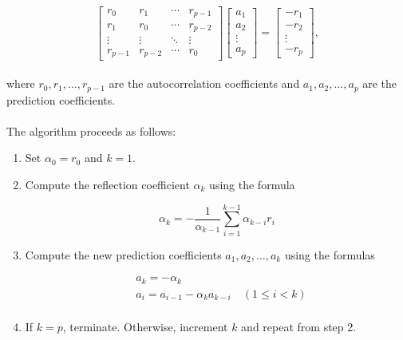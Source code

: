     \begin{equation*}
        \begin{bmatrix}
        r_0 & r_1 & \cdots & r_{p-1} \\
        r_1 & r_0 & \cdots & r_{p-2} \\
        \vdots & \vdots & \ddots & \vdots \\
        r_{p-1} & r_{p-2} & \cdots & r_0
        \end{bmatrix}
        \begin{bmatrix}
        a_1 \\
        a_2 \\
        \vdots \\
        a_p
        \end{bmatrix}
        =
        \begin{bmatrix}
        -r_1 \\
        -r_2 \\
        \vdots \\
        -r_p
        \end{bmatrix},
        \end{equation*}
        \\
        where $r_0, r_1, \ldots, r_{p-1}$ are the autocorrelation coefficients and $a_1, a_2, \ldots, a_p$ are the prediction coefficients.\\
        \\
        The algorithm proceeds as follows:
        
        \begin{enumerate}
        \item Set $\alpha_0 = r_0$ and $k = 1$.
        \item Compute the reflection coefficient $\alpha_k$ using the formula
        
        \begin{equation} \label{eq:levinson2}
            \alpha_k = -\frac{1}{\alpha_{k-1}} \sum_{i=1}^{k-1} \alpha_{k-i} r_i
        \end{equation}
        
        \item Compute the new prediction coefficients $a_1, a_2, \ldots, a_k$ using the formulas
        
        \begin{equation} \label{eq:levinson3}
            \begin{aligned}
                &a_k = -\alpha_k \\
                &a_i = a_{i-1} - \alpha_k a_{k-i} \quad (1 \leq i < k)\\
            \end{aligned}
        \end{equation}
        
        \item If $k = p$, terminate. Otherwise, increment $k$ and repeat from step 2.
        \end{enumerate}
        
